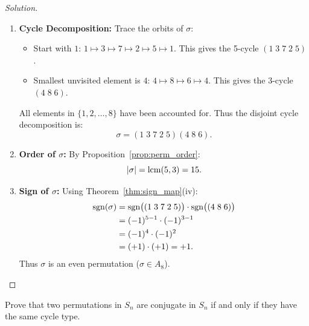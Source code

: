 \begin{proof}[Solution]
\begin{enumerate}[label=\arabic*., leftmargin=*]
    \item \textbf{Cycle Decomposition:}
    Trace the orbits of $\sigma$:
    \begin{itemize}[leftmargin=1.5em, itemsep=2pt]
        \item Start with $1$: $1 \mapsto 3 \mapsto 7 \mapsto 2 \mapsto 5 \mapsto 1$. This gives the 5-cycle $(1 \; 3 \; 7 \; 2 \; 5)$.
        \item Smallest unvisited element is $4$: $4 \mapsto 8 \mapsto 6 \mapsto 4$. This gives the 3-cycle $(4 \; 8 \; 6)$.
    \end{itemize}
    All elements in $\{1, 2, \dots, 8\}$ have been accounted for.
    Thus the disjoint cycle decomposition is:
    \begin{equation*}
    \sigma = (1 \; 3 \; 7 \; 2 \; 5)(4 \; 8 \; 6).
    \end{equation*}

    \item \textbf{Order of $\sigma$:}
    By Proposition~\ref{prop:perm_order}:
    \begin{equation*}
    |\sigma| = \operatorname{lcm}(5, 3) = 15.
    \end{equation*}

    \item \textbf{Sign of $\sigma$:}
    Using Theorem~\ref{thm:sign_map}(iv):
    \begin{align*}
    \operatorname{sgn}(\sigma) &= \operatorname{sgn}\bigl((1 \; 3 \; 7 \; 2 \; 5)\bigr) \cdot \operatorname{sgn}\bigl((4 \; 8 \; 6)\bigr) \\
    &= (-1)^{5-1} \cdot (-1)^{3-1} \\
    &= (-1)^4 \cdot (-1)^2 \\
    &= (+1) \cdot (+1) = +1.
    \end{align*}
    Thus $\sigma$ is an even permutation ($\sigma \in A_8$).
\end{enumerate}
\end{proof}

\begin{problem}
Prove that two permutations in $S_n$ are conjugate in $S_n$ if and only if they have the same cycle type.
\end{problem}

